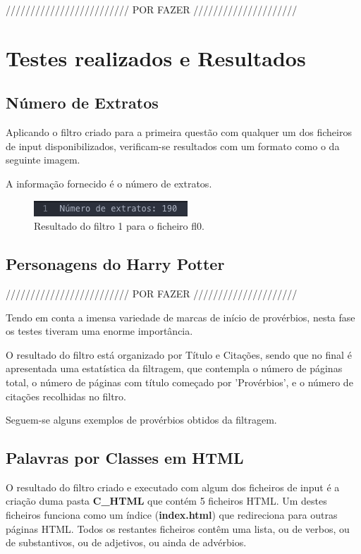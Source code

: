 \documentclass[11pt,a4paper]{report}
\begin{document}
///////////////////////// POR FAZER /////////////////////


\section{Testes realizados e Resultados}
\subsection{Número de Extratos}

Aplicando o filtro criado para a primeira questão com qualquer um dos ficheiros de input disponibilizados, verificam-se resultados com um formato como o da seguinte imagem.

A informação fornecido é o número de extratos.

\begin{figure}[H]
\centering
\includegraphics[scale=0.7]{testes1.png}
\caption{Resultado do filtro 1 para o ficheiro fl0.}
\label{img:testes1}
\end{figure}


\subsection{Personagens do Harry Potter}

///////////////////////// POR FAZER /////////////////////

Tendo em conta a imensa variedade de marcas de início de provérbios, nesta fase os testes tiveram uma enorme importância.

O resultado do filtro está organizado por Título e Citações, sendo que no final é apresentada uma estatística da filtragem, que contempla o número de páginas total, o número de páginas com título começado por 'Provérbios', e o número de citações recolhidas no filtro.

Seguem-se alguns exemplos de provérbios obtidos da filtragem.


\newpage

\subsection{Palavras por Classes em HTML}

O resultado do filtro criado e executado com algum dos ficheiros de input é a criação duma pasta \textbf{C\_HTML} que contém 5 ficheiros HTML. Um destes ficheiros funciona como um índice (\textbf{index.html}) que redireciona para outras páginas HTML. Todos os restantes ficheiros contêm uma lista, ou de verbos, ou de substantivos, ou de adjetivos, ou ainda de advérbios.
\end{document}
